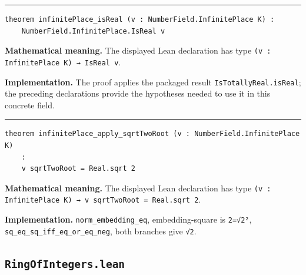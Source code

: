 \documentclass[UTF8,a4paper,11pt,fontset=fandol]{ctexart}
\theoremstyle{definition}
\newcommand{\statementsep}{\par\medskip\hrule\medskip}
\begin{document}
\statementsep
\begin{verbatim}
theorem infinitePlace_isReal (v : NumberField.InfinitePlace K) :
    NumberField.InfinitePlace.IsReal v
\end{verbatim}
\noindent\textbf{Mathematical meaning.} The displayed Lean declaration has type \texttt{(v : InfinitePlace K) → IsReal v}.\par
\noindent\textbf{Implementation.} The proof applies the packaged result \texttt{IsTotallyReal.\allowbreak{}isReal}; the preceding declarations provide the hypotheses needed to use it in this concrete field.\par
\statementsep
\begin{verbatim}
theorem infinitePlace_apply_sqrtTwoRoot (v : NumberField.InfinitePlace K)
    :
    v sqrtTwoRoot = Real.sqrt 2
\end{verbatim}
\noindent\textbf{Mathematical meaning.} The displayed Lean declaration has type \texttt{(v : InfinitePlace K) → v sqrtTwoRoot = Real.\allowbreak{}sqrt 2}.\par
\noindent\textbf{Implementation.} \texttt{norm\_\allowbreak{}embedding\_\allowbreak{}eq}, embedding-square is \texttt{2=√2²}, \texttt{sq\_\allowbreak{}eq\_\allowbreak{}sq\_\allowbreak{}iff\_\allowbreak{}eq\_\allowbreak{}or\_\allowbreak{}eq\_\allowbreak{}neg}, both branches give \texttt{√2}.\par

\subsection{\texttt{RingOfIntegers.lean}}
\end{document}
